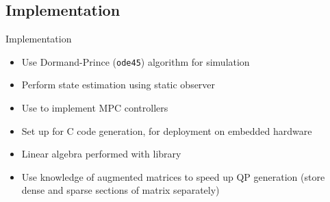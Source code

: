 \subsection{Implementation}
\begin{frame}{Implementation}
  \begin{itemize}
    \item Use Dormand-Prince (\texttt{ode45}) algorithm for simulation
     \item Perform state estimation using static observer
  \end{itemize}

  \begin{itemize}
    \item Use \emlab{} to implement MPC controllers
    \item Set up for C code generation, for deployment on embedded hardware
  \end{itemize}

  \structure{\cpp{}}
  \begin{itemize}
    \item Linear algebra performed with \eigen{} library
    \item Use knowledge of augmented matrices to speed up QP generation (store dense and sparse sections of matrix separately)
  \end{itemize}

\end{frame}



